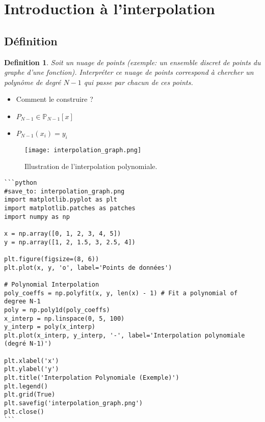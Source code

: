 \documentclass{article}
\newtheorem{definition}{Definition}
\begin{document}
\sloppy

\section{Introduction à l'interpolation}

\subsection{Définition}

\begin{definition}
Soit un nuage de points (exemple: un ensemble discret de points du graphe d'une fonction). Interpréter ce nuage de points correspond à chercher un polynôme de degré $N-1$ qui passe par chacun de ces points.
\end{definition}

\begin{itemize}
    \item Comment le construire ?
    \item $P_{N-1} \in \mathbb{P}_{N-1}[x]$
    \item $P_{N-1}(x_i) = y_i$
\end{itemize}

\begin{figure}[h]
    \centering
    \texttt{[image: interpolation\_graph.png]}
    \caption{Illustration de l'interpolation polynomiale.}
    \label{fig:interpolation_graph}
\end{figure}

\begin{verbatim}
```python
#save_to: interpolation_graph.png
import matplotlib.pyplot as plt
import matplotlib.patches as patches
import numpy as np

x = np.array([0, 1, 2, 3, 4, 5])
y = np.array([1, 2, 1.5, 3, 2.5, 4])

plt.figure(figsize=(8, 6))
plt.plot(x, y, 'o', label='Points de données')

# Polynomial Interpolation
poly_coeffs = np.polyfit(x, y, len(x) - 1) # Fit a polynomial of degree N-1
poly = np.poly1d(poly_coeffs)
x_interp = np.linspace(0, 5, 100)
y_interp = poly(x_interp)
plt.plot(x_interp, y_interp, '-', label='Interpolation polynomiale (degré N-1)')

plt.xlabel('x')
plt.ylabel('y')
plt.title('Interpolation Polynomiale (Exemple)')
plt.legend()
plt.grid(True)
plt.savefig('interpolation_graph.png')
plt.close()
```
\end{verbatim}
\end{document}
